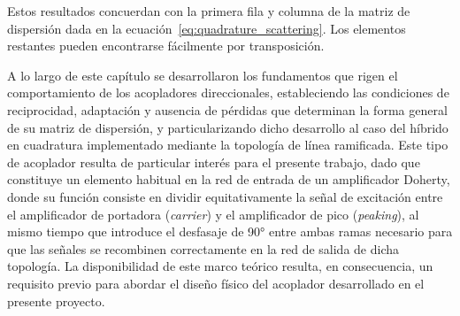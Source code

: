 Estos resultados concuerdan con la primera fila y columna de la matriz de dispersión dada en la ecuación~\eqref{eq:quadrature_scattering}. Los elementos restantes pueden encontrarse fácilmente por transposición.

A lo largo de este capítulo se desarrollaron los fundamentos que rigen el comportamiento de los acopladores direccionales, estableciendo las condiciones de reciprocidad, adaptación y ausencia de pérdidas que determinan la forma general de su matriz de dispersión, y particularizando dicho desarrollo al caso del híbrido en cuadratura implementado mediante la topología de línea ramificada. Este tipo de acoplador resulta de particular interés para el presente trabajo, dado que constituye un elemento habitual en la red de entrada de un amplificador Doherty, donde su función consiste en dividir equitativamente la señal de excitación entre el amplificador de portadora (\textit{carrier}) y el amplificador de pico (\textit{peaking}), al mismo tiempo que introduce el desfasaje de 90° entre ambas ramas necesario para que las señales se recombinen correctamente en la red de salida de dicha topología. La disponibilidad de este marco teórico resulta, en consecuencia, un requisito previo para abordar el diseño físico del acoplador desarrollado en el presente proyecto.

